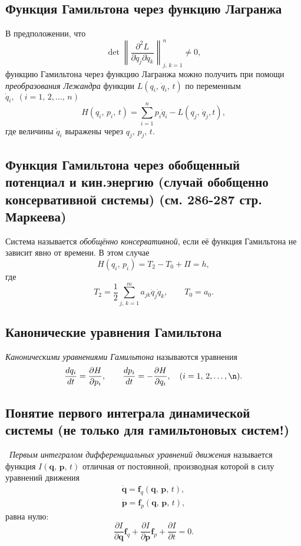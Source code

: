 \documentclass[a4paper]{article}
\begin{document}
\subsection{Функция Гамильтона через функцию Лагранжа}
В предположении, что
\[
	\det \left\|\frac{\partial ^2 L}{\partial \dot{q}_j \partial \dot{q}_k} \right\|^n
	_{j,\,k=1}\neq 0
,\]
функцию Гамильтона через функцию Лагранжа можно получить при помощи 
\emph{преобразования Лежандра} функции $L(q_i,\,\dot{q}_i,\,t)$ по переменным
$\dot{q}_i,\;(i=1,\,2,\ldots,\,n)$
\[
	H(q_i,\,p_i,\,t)= \sum_{i=1}^{n} p_i \dot{q}_i -L(q_j,\,\dot{q}_j,t)
,\]
где величины $\dot{q}_i$ выражены через $q_j,\,p_j,\,t$.
\subsection{Функция Гамильтона через обобщенный потенциал и кин.энергию (случай
обобщенно консервативной системы) (см. 286-287 стр. Маркеева)}
Система называется \emph{обобщённо консервативной}, если её функция Гамильтона
не зависит явно от времени. В этом случае
\[
	H(q_i,\,p_i)=T_2-T_0+\Pi=h
,\] 
где
\[
 T_2=\frac{1}{2}\sum_{j,\,k=1}^{m} a_{jk}\dot{q}_j\dot{q}_k,\qquad T_0=a_0
.\] 
\subsection{Канонические уравнения Гамильтона}
\begin{dfn}
	\emph{Каноническими уравнениями Гамильтона} называются уравнения
	\[
	\frac{dq_i}{dt}=\frac{\partial H}{\partial p_i},\qquad
	\frac{dp_i}{dt}=- \frac{\partial H}{\partial q_i}, \quad
	(i=1,\,2,\ldots,\n)
	.\] 
\end{dfn}
\subsection{Понятие первого интеграла динамической системы (не только для
гамильтоновых систем!)}
\begin{dfn}
	 \emph{Первым интегралом дифференциальных уравнений движения}
	называется функция $I(\mathbf{q},\,\mathbf{p},\,t)$ отличная от постоянной,
	производная которой в силу уравнений движения
	\begin{gather*}
		\dot{\mathbf{q}}=\mathbf{f}_q (\mathbf{q},\,\mathbf{p},\,t),\\
		\dot{\mathbf{p}}=\mathbf{f}_p (\mathbf{q},\,\mathbf{p},\,t),
	\end{gather*}
	равна нулю:
	\[
	\frac{\partial I}{\partial \mathbf{q}}\mathbf{f}_q+
	\frac{\partial I}{\partial \mathbf{p}} \mathbf{f}_p+
	\frac{\partial I}{\partial t}=0 
	.\] 
\end{dfn}
\end{document}
